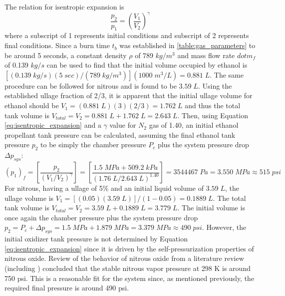 \documentclass[9pt]{article} %
\numberwithin{equation}{section} %
\begin{document}
The relation for isentropic expansion is
\begin{equation} \label{eq:isentropic_expansion}
\frac{p_{2}}{p_{1}} = \left( \frac{V_{1}}{V_{2}} \right) ^{\gamma}
\end{equation}
where a subscript of 1 represents initial conditions and subscript of 2 represents final conditions. Since a burn time $t_{b}$ was established in \ref{table:gas_parameters} to be around 5 seconds, a constant density $\rho$ of 789 $kg/m^{3}$ and mass flow rate $dot{m}_{f}$ of 0.139 $kg/s$ can be used to find that the initial volume occupied by ethanol is $[(0.139 \; kg/s)(5 \; sec)/(789 \; kg/m^{3})](1000 \; m^{3}/L) = 0.881 \; L$. The same procedure can be followed for nitrous and is found to be $3.59 \; L$. Using the established ullage fraction of 2/3, it is apparent that the initial ullage volume for ethanol should be $V_{1} = (0.881 \; L)(3)(2/3) = 1.762 \; L$ and thus the total tank volume is $V_{total} = V_{2} = 0.881 \; L + 1.762 \; L = 2.643 \; L$. Then, using Equation \ref{eq:isentropic_expansion} and a $\gamma$ value for $N_{2}$ gas of 1.40,  an initial ethanol propellant tank pressure can be calculated, assuming the final ethanol tank pressure $p_{2}$ to be simply the chamber pressure $P_{c}$ plus the system pressure drop $\Delta p_{sys}$:
\begin{equation*}
(p_{1})_{f} = \left[ \frac{p_{2}}{(V_{1}/V_{2})^{\gamma}} \right] = \left[ \frac{1.5 \; MPa + 509.2 \; kPa}{(1.76 \; L/2.643 \; L)^{1.40}} \right] = 3544467 \; Pa = 3.550 \; MPa \approx 515 \; psi
\end{equation*}
\hspace{\parindent} For nitrous, having a ullage of 5\% and an initial liquid volume of $3.59 \; L$, the ullage volume is $V_{1} = [(0.05)(3.59 \; L)]/(1-0.05) = 0.1889 \; L$. The total tank volume is $V_{total} = V_{2} = 3.59 \; L + 0.1889 \; L = 3.779 \; L$. The initial volume is once again the chamber pressure plus the system pressure drop $p_{2} = P_{c} + \Delta p_{sys} = 1.5 \; MPa + 1.879 \; MPa = 3.379 \; MPa \approx 490 \; psi$. However, the initial oxidizer tank pressure is not determined by Equation \ref{eq:isentropic_expansion} since it is driven by the self-pressurization properties of nitrous oxide. Review of the behavior of nitrous oxide from a literature review (including \cite{nitrous-paper}) concluded that the stable nitrous vapor pressure at 298 K is around 750 psi. This is a reasonable fit for the system since, as mentioned previously, the required final pressure is around 490 psi.
\end{document}
